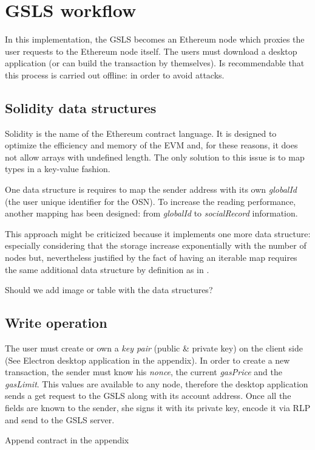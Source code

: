 \section{GSLS workflow}


In this implementation, the GSLS becomes an Ethereum node which proxies the user requests to the Ethereum node itself.
The users must download a desktop application (or can build the transaction by themselves). Is recommendable that this process is carried out offline: in order to avoid attacks.

\subsection{Solidity data structures}
Solidity is the name of the Ethereum contract language. It is designed to optimize the efficiency and memory of the EVM and, for these reasons, it does not allow arrays with undefined length.
The only solution to this issue is to map types in a key-value fashion.

One data structure is requires to map the sender address with its own \textit{globalId} (the user unique identifier for the OSN).  To increase the reading performance, another mapping has been designed: from \textit{globalId} to \textit{socialRecord} information.

This approach might be criticized because it implements one more data structure: especially considering that the storage increase exponentially with the number of nodes but, nevertheless justified by the fact of having an iterable map requires the same additional data structure by definition as in \cite{datastructure_solidity}.

\begin{notation}
  Should we add image or table with the data structures?
\end{notation}


\subsection{Write operation}
The user must create or own a \textit{key pair} (public \& private key) on the client side (See Electron desktop application in the appendix).
In order to create a new transaction, the sender must know his \textit{nonce}, the current \textit{gasPrice} and the \textit{gasLimit}. This values are available to any node, therefore the desktop application sends a get request to the GSLS along with its account address. Once all the fields are known to the sender, she signs it with its private key, encode it via RLP and send to the GSLS server.

\begin{notation}
  Append contract in the appendix
\end{notation}